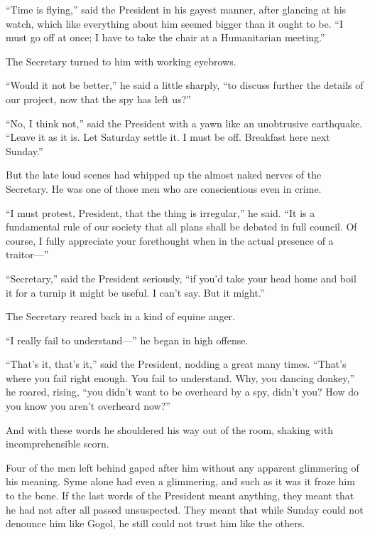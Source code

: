 “Time is flying,” said the President in his gayest manner, after glancing at his watch, which like everything about him seemed bigger than it ought to be. “I must go off at once; I have to take the chair at a Humanitarian meeting.”

The Secretary turned to him with working eyebrows.

“Would it not be better,” he said a little sharply, “to discuss further the details of our project, now that the spy has left us?”

“No, I think not,” said the President with a yawn like an unobtrusive earthquake. “Leave it as it is. Let Saturday settle it. I must be off. Breakfast here next Sunday.”

But the late loud scenes had whipped up the almost naked nerves of the Secretary. He was one of those men who are conscientious even in crime.

“I must protest, President, that the thing is irregular,” he said. “It is a fundamental rule of our society that all plans shall be debated in full council. Of course, I fully appreciate your forethought when in the actual presence of a traitor⁠—”

“Secretary,” said the President seriously, “if you’d take your head home and boil it for a turnip it might be useful. I can’t say. But it might.”

The Secretary reared back in a kind of equine anger.

“I really fail to understand⁠—” he began in high offense.

“That’s it, that’s it,” said the President, nodding a great many times. “That’s where you fail right enough. You fail to understand. Why, you dancing donkey,” he roared, rising, “you didn’t want to be overheard by a spy, didn’t you? How do you know you aren’t overheard now?”

And with these words he shouldered his way out of the room, shaking with incomprehensible scorn.

Four of the men left behind gaped after him without any apparent glimmering of his meaning. Syme alone had even a glimmering, and such as it was it froze him to the bone. If the last words of the President meant anything, they meant that he had not after all passed unsuspected. They meant that while Sunday could not denounce him like Gogol, he still could not trust him like the others.

